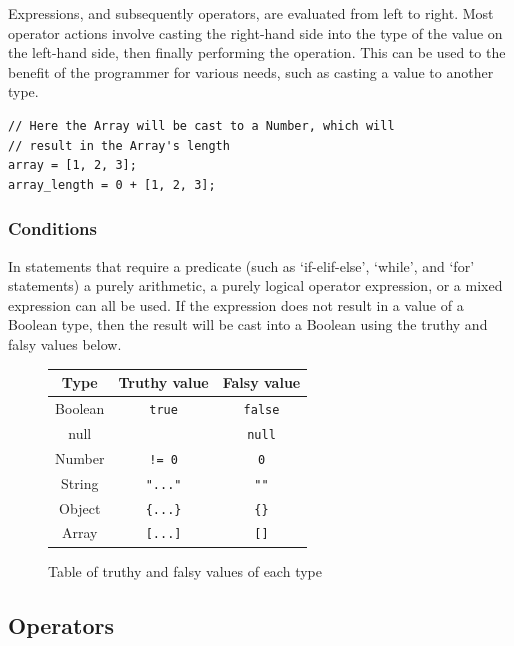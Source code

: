 \documentclass[]{full}
\theoremstyle{definition}
\begin{document}
Expressions, and subsequently operators, are evaluated from left to right. Most operator actions involve casting the right-hand side into the type of the value on the left-hand side, then finally performing the operation. This can be used to the benefit of the programmer for various needs, such as casting a value to another type.

\begin{verbatim}
// Here the Array will be cast to a Number, which will 
// result in the Array's length
array = [1, 2, 3];
array_length = 0 + [1, 2, 3];
\end{verbatim}

\subsubsection{Conditions}

In statements that require a predicate (such as `if-elif-else', `while', and `for' statements) a purely arithmetic, a purely logical operator expression, or a mixed expression can all be used. If the expression does not result in a value of a Boolean type, then the result will be cast into a Boolean using the truthy and falsy values below.

\begin{figure}[H]
    \begin{center}
        \begin{tabular}{| c | c | c |}
            \hline
            Type & Truthy value & Falsy value\\
            \hline
            Boolean & \verb|true| & \verb|false|\\
            \hline
            null & & \verb|null|\\
            \hline
            Number & \verb|!= 0| & \verb|0|\\
            \hline
            String & \verb|"..."| & \verb|""|\\
            \hline
            Object & \verb|{...}| & \verb|{}|\\
            \hline
            Array & \verb|[...]| & \verb|[]|\\
            \hline
        \end{tabular}
    \end{center}
    \caption{Table of truthy and falsy values of each type}
\end{figure}

\subsection{Operators}
\end{document}
